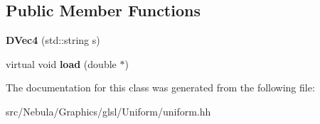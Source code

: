 \subsection*{\-Public \-Member \-Functions}
\begin{DoxyCompactItemize}
\item 
\hypertarget{classNeb_1_1glsl_1_1Uniform_1_1Scalar_1_1DVec4_ab8470910b7562c6a60cb01270b1fa028}{{\bfseries \-D\-Vec4} (std\-::string s)}\label{classNeb_1_1glsl_1_1Uniform_1_1Scalar_1_1DVec4_ab8470910b7562c6a60cb01270b1fa028}

\item 
\hypertarget{classNeb_1_1glsl_1_1Uniform_1_1Scalar_1_1DVec4_af843bf42042cbe62f8744a1621ef4178}{virtual void {\bfseries load} (double $\ast$)}\label{classNeb_1_1glsl_1_1Uniform_1_1Scalar_1_1DVec4_af843bf42042cbe62f8744a1621ef4178}

\end{DoxyCompactItemize}


\-The documentation for this class was generated from the following file\-:\begin{DoxyCompactItemize}
\item 
src/\-Nebula/\-Graphics/glsl/\-Uniform/uniform.\-hh\end{DoxyCompactItemize}
